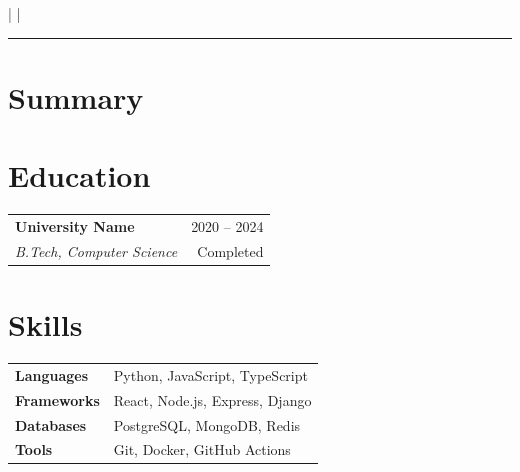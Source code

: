 \documentclass[10pt, a4paper]{article}
\makeatletter
\newcommand{\contactitem}[1]{\small #1}
\newcommand{\eduentry}[4]{%
  \noindent
  \begin{tabularx}{\linewidth}{@{}X r@{}}
    \textbf{#1} & \textcolor{subtle}{\small #4} \\
    \textit{\small #2} & \textcolor{subtle}{\small #3}
  \end{tabularx}
  \vspace{4pt}
}
\makeatother
\begin{document}

\begin{center}
  {\LARGE\bfseries\color{accent} \VarName}\\[4pt]
  {\small \VarRole}\\[6pt]
  \contactitem{\VarEmail}
  \quad\textcolor{subtle}{|}\quad
  \contactitem{\VarPhone}
  \quad\textcolor{subtle}{|}\quad
  \contactitem{\VarLocation}
\end{center}

\vspace{4pt}
\textcolor{accent}{\rule{\linewidth}{0.8pt}}
\vspace{6pt}

\section{Summary}
\VarSummary

\section{Education}
\eduentry{University Name}{B.Tech, Computer Science}{Completed}{2020 -- 2024}

\section{Skills}
\noindent
\begin{tabularx}{\linewidth}{@{} l X @{}}
  \textbf{Languages}   & Python, JavaScript, TypeScript \\[2pt]
  \textbf{Frameworks}  & React, Node.js, Express, Django \\[2pt]
  \textbf{Databases}   & PostgreSQL, MongoDB, Redis \\[2pt]
  \textbf{Tools}       & Git, Docker, GitHub Actions \\
\end{tabularx}

\end{document}
